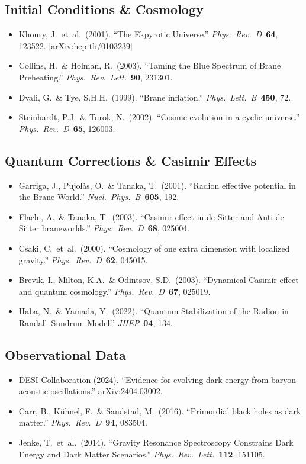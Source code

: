 \subsection*{Initial Conditions \& Cosmology}
\begin{itemize}
  \item Khoury, J.\ et~al.\ (2001). ``The Ekpyrotic Universe.'' \textit{Phys.\ Rev.\ D}\ \textbf{64}, 123522. [arXiv:hep-th/0103239]
  \item Collins, H.\ \& Holman, R.\ (2003). ``Taming the Blue Spectrum of Brane Preheating.'' \textit{Phys.\ Rev.\ Lett.}\ \textbf{90}, 231301.
  \item Dvali, G.\ \& Tye, S.H.H.\ (1999). ``Brane inflation.'' \textit{Phys.\ Lett.\ B}\ \textbf{450}, 72.
  \item Steinhardt, P.J.\ \& Turok, N.\ (2002). ``Cosmic evolution in a cyclic universe.'' \textit{Phys.\ Rev.\ D}\ \textbf{65}, 126003.
\end{itemize}

\subsection*{Quantum Corrections \& Casimir Effects}
\begin{itemize}
  \item Garriga, J., Pujol\`as, O.\ \& Tanaka, T.\ (2001). ``Radion effective potential in the Brane-World.'' \textit{Nucl.\ Phys.\ B}\ \textbf{605}, 192.
  \item Flachi, A.\ \& Tanaka, T.\ (2003). ``Casimir effect in de Sitter and Anti-de Sitter braneworlds.'' \textit{Phys.\ Rev.\ D}\ \textbf{68}, 025004.
  \item Csaki, C.\ et~al.\ (2000). ``Cosmology of one extra dimension with localized gravity.'' \textit{Phys.\ Rev.\ D}\ \textbf{62}, 045015.
  \item Brevik, I., Milton, K.A.\ \& Odintsov, S.D.\ (2003). ``Dynamical Casimir effect and quantum cosmology.'' \textit{Phys.\ Rev.\ D}\ \textbf{67}, 025019.
  \item Haba, N.\ \& Yamada, Y.\ (2022). ``Quantum Stabilization of the Radion in Randall--Sundrum Model.'' \textit{JHEP}\ \textbf{04}, 134.
\end{itemize}

\subsection*{Observational Data}
\begin{itemize}
  \item DESI Collaboration (2024). ``Evidence for evolving dark energy from baryon acoustic oscillations.'' arXiv:2404.03002.
  \item Carr, B., K\"uhnel, F.\ \& Sandstad, M.\ (2016). ``Primordial black holes as dark matter.'' \textit{Phys.\ Rev.\ D}\ \textbf{94}, 083504.
  \item Jenke, T.\ et~al.\ (2014). ``Gravity Resonance Spectroscopy Constrains Dark Energy and Dark Matter Scenarios.'' \textit{Phys.\ Rev.\ Lett.}\ \textbf{112}, 151105.
\end{itemize}

